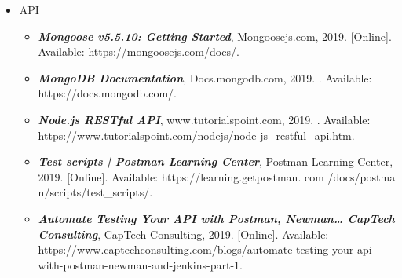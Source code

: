 \documentclass[12pt, a4paper]{report}
\begin{document}
\begin{itemize}
    \item API
        \begin{itemize}
        \item \textbf{\textit{Mongoose v5.5.10: Getting Started}}, Mongoosejs.com, 2019. [Online]. Available: https://mongoosejs.com/docs/. 
        \item \textbf{\textit{MongoDB Documentation}}, Docs.mongodb.com, 2019. \newline[Online]. Available: https://docs.mongodb.com/. 
        \item \textbf{\textit{Node.js RESTful API}}, www.tutorialspoint.com, 2019. \newline[Online]. Available: https://www.tutorialspoint.com/nodejs/node js{\_}restful{\_}api.htm. 
        \item \textbf{\textit{Test scripts | Postman Learning Center}}, Postman Learning Center, 2019. [Online]. Available: https://learning.getpostman. com /docs/postma n/scripts/test{\_}scripts/. 
        \item \textbf{\textit{Automate Testing Your API with Postman, Newman… {\textbar} CapTech Consulting}}, CapTech Consulting, 2019. [Online]. Available: https://www.captechconsulting.com/blogs/automate-testing-your-api-with-postman-newman-and-jenkins-part-1. 
        \end{itemize}
\end{itemize}
\end{document}

